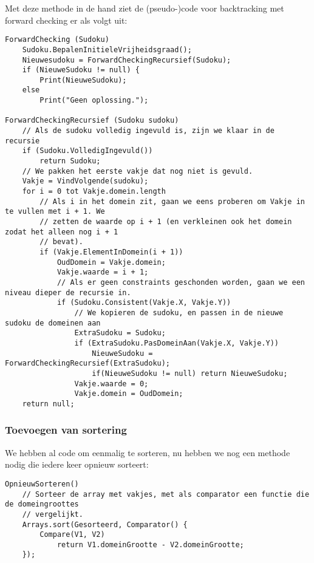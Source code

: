 \documentclass[]{report}
\begin{document}
Met deze methode in de hand ziet de (pseudo-)code voor backtracking met forward checking er als volgt uit:

\begin{minipage}{\textwidth}
\begin{lstlisting}
ForwardChecking (Sudoku)
	Sudoku.BepalenInitieleVrijheidsgraad();
	Nieuwesudoku = ForwardCheckingRecursief(Sudoku);
	if (NieuweSudoku != null) {
		Print(NieuweSudoku);
	else 
		Print("Geen oplossing.");
	
ForwardCheckingRecursief (Sudoku sudoku)
	// Als de sudoku volledig ingevuld is, zijn we klaar in de recursie
	if (Sudoku.VolledigIngevuld())
		return Sudoku;
	// We pakken het eerste vakje dat nog niet is gevuld.	
	Vakje = VindVolgende(sudoku);
	for i = 0 tot Vakje.domein.length
		// Als i in het domein zit, gaan we eens proberen om Vakje in te vullen met i + 1. We 
		// zetten de waarde op i + 1 (en verkleinen ook het domein zodat het alleen nog i + 1
		// bevat).
		if (Vakje.ElementInDomein(i + 1))
			OudDomein = Vakje.domein;
			Vakje.waarde = i + 1;
			// Als er geen constraints geschonden worden, gaan we een niveau dieper de recursie in.
			if (Sudoku.Consistent(Vakje.X, Vakje.Y))
				// We kopieren de sudoku, en passen in de nieuwe sudoku de domeinen aan
				ExtraSudoku = Sudoku;
				if (ExtraSudoku.PasDomeinAan(Vakje.X, Vakje.Y))
					NieuweSudoku = ForwardCheckingRecursief(ExtraSudoku);
					if(NieuweSudoku != null) return NieuweSudoku;
				Vakje.waarde = 0;
				Vakje.domein = OudDomein;
	return null;
\end{lstlisting}
\end{minipage}

\subsubsection{Toevoegen van sortering}
We hebben al code om eenmalig te sorteren, nu hebben we nog een methode nodig die iedere keer opnieuw sorteert:

\begin{minipage}{\textwidth}
\begin{lstlisting}
OpnieuwSorteren()
	// Sorteer de array met vakjes, met als comparator een functie die de domeingroottes 
	// vergelijkt.
	Arrays.sort(Gesorteerd, Comparator() {
	    Compare(V1, V2)
	        return V1.domeinGrootte - V2.domeinGrootte;
	});
\end{lstlisting}
\end{minipage}
\end{document}
